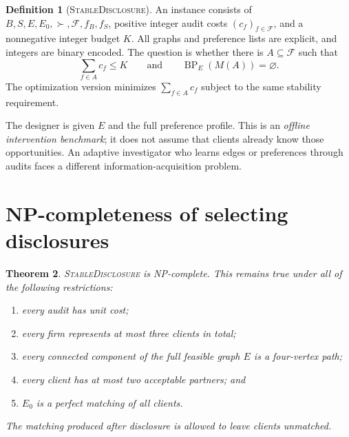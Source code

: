 \documentclass[11pt,letterpaper]{article}
\newtheorem{theorem}{Theorem}[section]
\theoremstyle{definition}
\newtheorem{definition}[theorem]{Definition}
\theoremstyle{remark}
\newcommand{\BP}{\operatorname{BP}}
\newcommand{\SD}{\textsc{StableDisclosure}}
\newcommand{\Feas}{\mathcal{F}}
\begin{document}
\begin{definition}[\SD]
An instance consists of \(B,S,E,E_0,\succ,\Feas,f_B,f_S\), positive integer
audit costs \((c_f)_{f\in\Feas}\), and a nonnegative integer budget \(K\).
All graphs and preference lists are explicit, and integers are binary encoded.
The question is whether there is \(A\subseteq\Feas\) such that
\[
\sum_{f\in A}c_f\leq K
\qquad\text{and}\qquad
\BP_E(M(A))=\varnothing.
\]
The optimization version minimizes \(\sum_{f\in A}c_f\) subject to the same
stability requirement.
\end{definition}

The designer is given \(E\) and the full preference profile. This is an
\emph{offline intervention benchmark}; it does not assume that clients already
know those opportunities. An adaptive investigator who learns edges or
preferences through audits faces a different information-acquisition problem.

\section{NP-completeness of selecting disclosures}

\begin{theorem}
\label{thm:hardness}
\SD{} is NP-complete. This remains true under all of the following restrictions:
\begin{enumerate}[label=(\roman*)]
\item every audit has unit cost;
\item every firm represents at most three clients in total;
\item every connected component of the full feasible graph \(E\) is a
      four-vertex path;
\item every client has at most two acceptable partners; and
\item \(E_0\) is a perfect matching of all clients.
\end{enumerate}
The matching produced after disclosure is allowed to leave clients unmatched.
\end{theorem}
\end{document}
